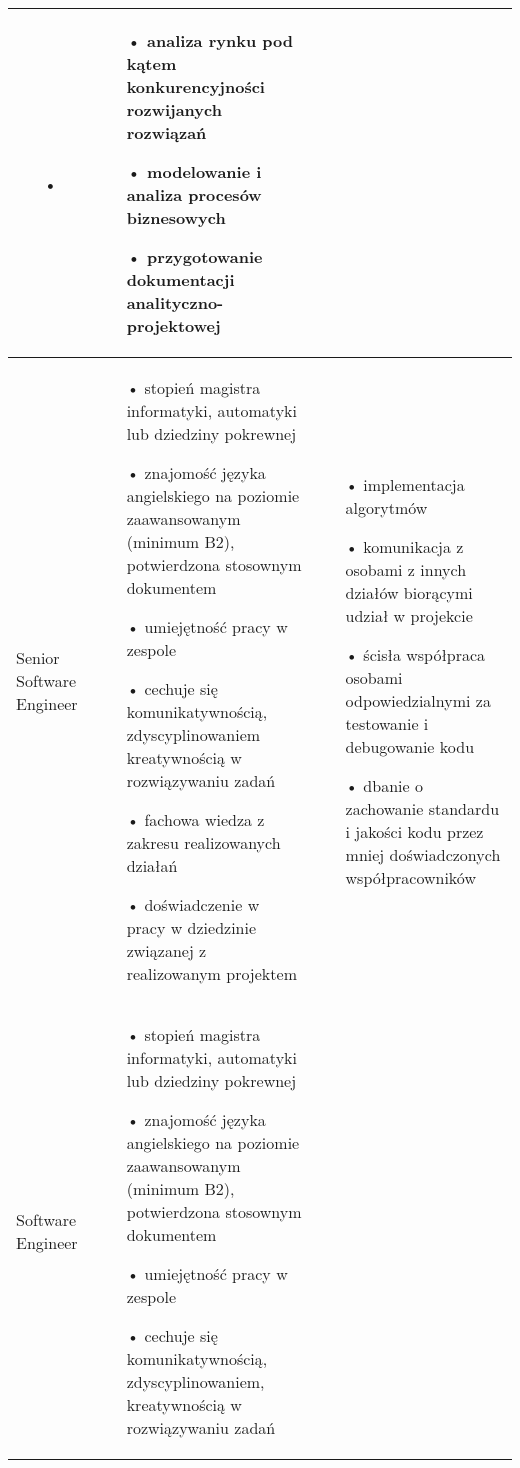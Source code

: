 \begin{center}
\begin{longtable}{ | l | p{5cm} | p{5cm} |}
\begin{itemize}
	\item[•]
	\end{itemize}	    	
     & 
	\begin{itemize}
	\item[•] analiza rynku pod kątem konkurencyjności rozwijanych rozwiązań
	\item[•] modelowanie i analiza procesów biznesowych
	\item[•] przygotowanie dokumentacji analityczno-projektowej
	\end{itemize}	   
	\\ \hline
    Senior Software Engineer & 
	\begin{itemize}
	\item[•] stopień magistra informatyki, automatyki lub dziedziny pokrewnej
	\item[•] znajomość języka angielskiego na poziomie zaawansowanym (minimum B2), potwierdzona stosownym dokumentem
	\item[•] umiejętność pracy w zespole
	\item[•] cechuje się komunikatywnością, zdyscyplinowaniem kreatywnością w rozwiązywaniu zadań 
	\item[•] fachowa wiedza z zakresu realizowanych działań
	\item[•] doświadczenie w pracy w dziedzinie związanej z realizowanym projektem 
	\end{itemize}	    
     & 
	\begin{itemize}
	\item[•] implementacja algorytmów 
	\item[•] komunikacja z osobami z innych działów biorącymi udział w projekcie
	\item[•] ścisła współpraca osobami odpowiedzialnymi za testowanie i debugowanie kodu
	\item[•] dbanie o zachowanie standardu i jakości kodu przez mniej doświadczonych współpracowników
	\end{itemize}	     
    \\ \hline   
    Software Engineer &
    \begin{itemize}
	\item[•] stopień magistra informatyki, automatyki lub dziedziny pokrewnej
	\item[•] znajomość języka angielskiego na poziomie zaawansowanym (minimum B2), potwierdzona stosownym dokumentem
	\item[•] umiejętność pracy w zespole
	\item[•] cechuje się komunikatywnością, zdyscyplinowaniem, kreatywnością w rozwiązywaniu zadań 

\end{itemize}
\end{longtable}
\end{center}
